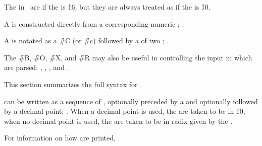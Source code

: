 The  in \thenextfigure\ are 
if the  is \f{16}, 
but they are always treated as  if the  is \f{10}. 


\endsubsubsubsection%

\endsubsubsection%

\endsubsection%


A  is constructed directly from a corresponding numeric ;
\seefigure\SyntaxForNumericTokens.

A  is notated as a \f{\#C} (or \f{\#c}) followed by a 
of two ; \seesection\SharpsignC.

The  \f{\#B}, \f{\#O}, \f{\#X}, and \f{\#R} may also be useful
in controlling the input  in which  are parsed;
 \seesection\SharpsignB,
     \secref\SharpsignO,
     \secref\SharpsignX,
 and \secref\SharpsignR.

This section summarizes the full syntax for .





 can be written as a sequence of , 
optionally preceded by a  and optionally followed by a decimal point;
\seefigure\SyntaxForNumericTokens.
When a decimal point is used,
the  are taken to be in  \f{10};
when no decimal point is used,
the  are taken to be in radix given by the .

For information on how  are printed, \seesection\PrintingIntegers.

\endsubsubsubsection%


